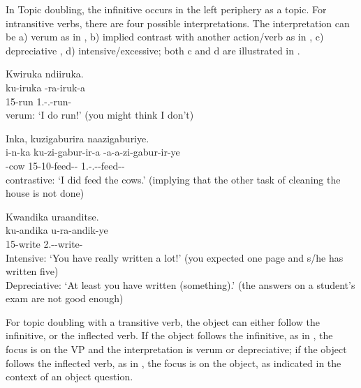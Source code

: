 \documentclass[output=paper]{langscibook}
\begin{document}
In Topic doubling, the infinitive occurs in the left periphery as a topic. For intransitive verbs, there are four possible interpretations. The interpretation can be a) verum as in , b) implied contrast with another action/verb as in , c) depreciative \citep[cf.~][]{Meeussen1967}, d) intensive/excessive; both c and d are illustrated in .

\ea
\label{bkm:Ref72248348}
Kwiruka ndiiruka.\\
\gll
ku-iruka  \N{}-ra-iruk-a\\
15-run  1\SG.\SM-\PRS.\DJ-{}run-\FV{}\\
\glt
verum: ‘I do run!’ (you might think I don’t)\\

\z

\ea
\label{bkm:Ref72248357}
Inka, kuzigaburira naazigaburiye.\\
\gll
i-n-ka  ku-zi-gabur-ir-a  \N{}-a-a-zi-gabur-ir-ye\\
-cow  15-10\OM-{}feed-\APPL-\FV{}  1\SG.\SM-\N.\PST-\OM{}-feed-\APPL-\PFV{}\\
\glt
contrastive: ‘I did feed the cows.’ (implying that the other task of cleaning the house is not done)\\

\z

\ea
\label{bkm:Ref72248384}
Kwandika uraanditse.\\
\gll
ku-andika  u-ra-andik-ye\\
15-write  2\SG.\SM-\DJ{}-write-\PFV{}\\
\glt
Intensive: ‘You have really written a lot!’ (you expected one page and s/he has written five)\\
  Depreciative: ‘At least you have written (something).’ (the answers on a student’s exam are not good enough)


\z

For topic doubling with a transitive verb, the object can either follow the infinitive, or the inflected verb. If the object follows the infinitive, as in , the focus is on the VP and the interpretation is verum or depreciative; if the object follows the inflected verb, as in , the focus is on the object, as indicated in the context of an object question.
\end{document}
